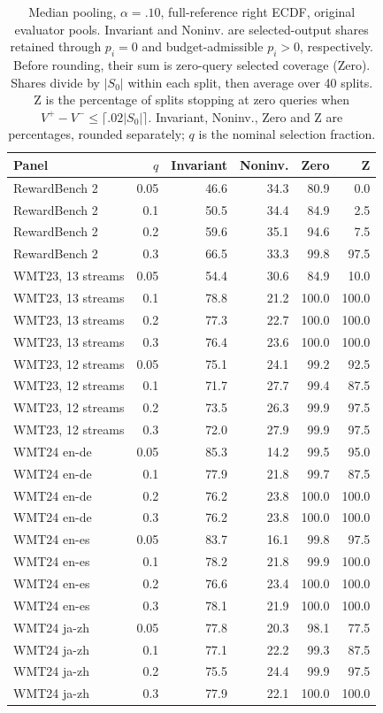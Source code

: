 \begin{table}[t]
\centering\small
\begin{tabular}{lrrrrr}
\toprule
Panel & $q$ & Invariant & Noninv. & Zero & Z \\
\midrule
RewardBench 2 & 0.05 & 46.6 & 34.3 & 80.9 & 0.0 \\
RewardBench 2 & 0.1 & 50.5 & 34.4 & 84.9 & 2.5 \\
RewardBench 2 & 0.2 & 59.6 & 35.1 & 94.6 & 7.5 \\
RewardBench 2 & 0.3 & 66.5 & 33.3 & 99.8 & 97.5 \\
WMT23, 13 streams & 0.05 & 54.4 & 30.6 & 84.9 & 10.0 \\
WMT23, 13 streams & 0.1 & 78.8 & 21.2 & 100.0 & 100.0 \\
WMT23, 13 streams & 0.2 & 77.3 & 22.7 & 100.0 & 100.0 \\
WMT23, 13 streams & 0.3 & 76.4 & 23.6 & 100.0 & 100.0 \\
WMT23, 12 streams & 0.05 & 75.1 & 24.1 & 99.2 & 92.5 \\
WMT23, 12 streams & 0.1 & 71.7 & 27.7 & 99.4 & 87.5 \\
WMT23, 12 streams & 0.2 & 73.5 & 26.3 & 99.9 & 97.5 \\
WMT23, 12 streams & 0.3 & 72.0 & 27.9 & 99.9 & 97.5 \\
WMT24 en-de & 0.05 & 85.3 & 14.2 & 99.5 & 95.0 \\
WMT24 en-de & 0.1 & 77.9 & 21.8 & 99.7 & 87.5 \\
WMT24 en-de & 0.2 & 76.2 & 23.8 & 100.0 & 100.0 \\
WMT24 en-de & 0.3 & 76.2 & 23.8 & 100.0 & 100.0 \\
WMT24 en-es & 0.05 & 83.7 & 16.1 & 99.8 & 97.5 \\
WMT24 en-es & 0.1 & 78.2 & 21.8 & 99.9 & 100.0 \\
WMT24 en-es & 0.2 & 76.6 & 23.4 & 100.0 & 100.0 \\
WMT24 en-es & 0.3 & 78.1 & 21.9 & 100.0 & 100.0 \\
WMT24 ja-zh & 0.05 & 77.8 & 20.3 & 98.1 & 77.5 \\
WMT24 ja-zh & 0.1 & 77.1 & 22.2 & 99.3 & 87.5 \\
WMT24 ja-zh & 0.2 & 75.5 & 24.4 & 99.9 & 97.5 \\
WMT24 ja-zh & 0.3 & 77.9 & 22.1 & 100.0 & 100.0 \\
\bottomrule
\end{tabular}
\caption{Median pooling, $\alpha=.10$, full-reference right ECDF, original evaluator pools. Invariant and Noninv. are selected-output shares retained through $p_i=0$ and budget-admissible $p_i>0$, respectively. Before rounding, their sum is zero-query selected coverage (Zero). Shares divide by $|S_0|$ within each split, then average over 40 splits. Z is the percentage of splits stopping at zero queries when $V^+-V^-\le\lceil.02|S_0|\rceil$. Invariant, Noninv., Zero and Z are percentages, rounded separately; $q$ is the nominal selection fraction.}
\label{tab:zero-decomposition}
\end{table}

